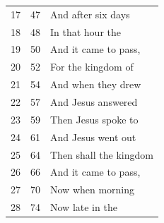 \documentclass{article}
\newlength{\minipageheight}
\newlength{\minipagewidth}
\begin{document}
\begin{minipage}[r][\minipageheight][t]{\minipagewidth}
\begin{longtable}{ccl}
        17          & 47            & And after six days              \\
        18          & 48            & In that hour the                \\
        19          & 50            & And it came to pass,            \\
        20          & 52 \cancel{¶} & For the kingdom of              \\
        21          & 54            & And when they drew              \\
        22          & 57            & And Jesus answered              \\
        23          & 59            & Then Jesus spoke to             \\
        24          & 61            & And Jesus went out              \\
        25          & 64            & Then shall the kingdom          \\
        26          & 66            & And it came to pass,            \\
        27          & 70            & Now when morning                \\
        28          & 74            & Now late in the                 \\


\end{longtable}
\end{minipage}
\end{document}
